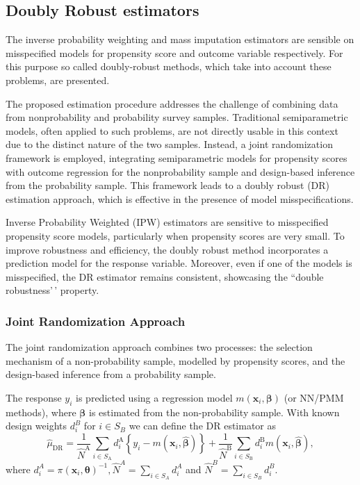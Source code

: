 \documentclass[
]{jss}
\begin{document}
\subsection{Doubly Robust estimators}\label{doubly-robust-estimators}

The inverse probability weighting and mass imputation estimators are
sensible on misspecified models for propensity score and outcome
variable respectively. For this purpose so called doubly-robust methods,
which take into account these problems, are presented.

The proposed estimation procedure addresses the challenge of combining
data from nonprobability and probability survey samples. Traditional
semiparametric models, often applied to such problems, are not directly
usable in this context due to the distinct nature of the two samples.
Instead, a joint randomization framework is employed, integrating
semiparametric models for propensity scores with outcome regression for
the nonprobability sample and design-based inference from the
probability sample. This framework leads to a doubly robust (DR)
estimation approach, which is effective in the presence of model
misspecifications.

Inverse Probability Weighted (IPW) estimators are sensitive to
misspecified propensity score models, particularly when propensity
scores are very small. To improve robustness and efficiency, the doubly
robust method incorporates a prediction model for the response variable.
Moreover, even if one of the models is misspecified, the DR estimator
remains consistent, showcasing the ``double robustness'\,' property.

\subsubsection{Joint Randomization
Approach}\label{joint-randomization-approach}

The joint randomization approach combines two processes: the selection
mechanism of a non-probability sample, modelled by propensity scores,
and the design-based inference from a probability sample.

The response \(y_i\) is predicted using a regression model
\(m(\boldsymbol{x}_i, \boldsymbol{\beta})\) (or NN/PMM methods), where
\(\boldsymbol{\beta}\) is estimated from the non-probability sample.
With known design weights \(d_i^B\) for \(i \in S_B\) we can define the
DR estimator as \begin{equation}
\label{dr}
\hat{\mu}_{\mathrm{DR}}=\frac{1}{\hat{N}^{\mathrm{A}}} \sum_{i \in S_{\mathrm{A}}} d_i^{\mathrm{A}}\left\{y_i-m\left(\boldsymbol{x}_i, \hat{\boldsymbol{\beta}}\right)\right\}+\frac{1}{\hat{N}^{\mathrm{B}}} \sum_{i \in S_{\mathrm{B}}} d_i^{\mathrm{B}} m\left(\boldsymbol{x}_i, \hat{\boldsymbol{\beta}}\right),
\end{equation} where
\(d_i^A=\pi\left(\boldsymbol{x}_i, \boldsymbol{\theta}\right)^{-1}, \hat{N}^A=\sum_{i \in S_A} d_i^A\)
and \(\hat{N}^B=\sum_{i \in S_B} d_i^B\).
\end{document}
